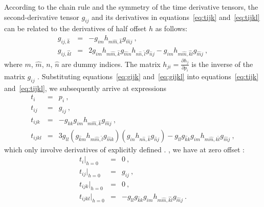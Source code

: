 According to the chain rule and the symmetry of the time derivative tensors, the second-derivative tensor $g_{ij}$ and its derivatives in equations~\ref{eq:tijk} and~\ref{eq:tijkl} can be related to the derivatives of half offset $h$ as follows:
\begin{eqnarray}
\label{eq:gijk}
g_{ij,\hat{k}}  & = & - g_{im}h_{m \hat{m},\hat{k}}g_{\hat{m}j}~,\\
\label{eq:gijkl}
 g_{ij,\hat{k}\hat{l}} & = & 2g_{im}h_{m \hat{m},\hat{k}}g_{\hat{m} n} h_{n \hat{n},\hat{l}} g_{\hat{n} j} - g_{i m}h_{m \hat{m},\hat{k}\hat{l}}g_{\hat{m}j}~,
\end{eqnarray}
where $m$, $\hat{m}$, $n$, $\hat{n}$ are dummy indices. The matrix $h_{ji}=\frac{\partial h_j}{\partial p_i}$ is the inverse of the matrix $g_{ij}$ . Substituting equations~\ref{eq:gijk} and~\ref{eq:gijkl} into equations~\ref{eq:tijk} and~\ref{eq:tijkl}, we subsequently arrive at expressions
\begin{eqnarray}
\label{eq:coeffgeneralexpandsub1}
t_i  & = & p_i~,\\
t_{ij} & = & g_{ij}~,\\
t_{ijk} & = & -g_{\hat{k}k}g_{im}h_{m \hat{m},\hat{k}}g_{\hat{m}j} ~,\\
\label{eq:coeffgeneralexpandsub4}
t_{ijkl} & =  &3 g_{\hat{l}l}(g_{\hat{k} m}h_{m \hat{m},\hat{l}}g_{\hat{m}k}) (g_{in}h_{n \hat{n},\hat{k}}g_{\hat{n}j})-  g_{\hat{l}l}g_{\hat{k}k}g_{im}h_{m \hat{m},\hat{k}\hat{l}}g_{\hat{m}j}~,
\end{eqnarray}
which only involve derivatives of explicitly defined . , we have at zero offset :
\begin{eqnarray}
\label{eq:ti0}
t_i|_{h=0}  & = & 0 ~,\\
\label{eq:tij0}
t_{ij}|_{h=0} & = & g_{ij}~,\\
\label{eq:tijk0}
t_{ijk}|_{h=0} & = & 0 ~,\\
\label{eq:tijkl0}
t_{ijkl}|_{h=0} & =  & -  g_{\hat{l}l}g_{\hat{k}k}g_{im}h_{m \hat{m},\hat{k}\hat{l}}g_{\hat{m}j}~.
\end{eqnarray}

